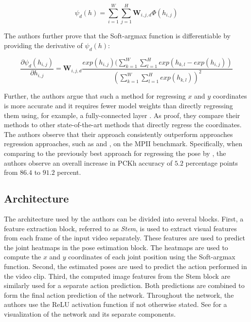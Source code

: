 \begin{equation}
    \label{eq:softargmax_conv}
    \psi_d(h) = \sum_{i=1}^W \sum_{j=1}^H \bm{W}_{i,j,d} \Phi(h_{i,j})
\end{equation}

The authors further prove that the Soft-argmax function is differentiable by providing the derivative of $\psi_d(h)$:

\begin{equation}
    \frac{\partial \psi_d(h_{i,j})}{\partial h_{i,j}} = \bm{W}_{i,j,d} \frac{ exp(h_{i,j}) (\sum_{k=1}^W \sum_{l=1}^H exp(h_{k,l} - exp(h_{i,j}) ) } { ( \sum_{k=1}^W \sum_{l=1}^H exp(h_{k,l}) )^2 }
\end{equation}

Further, the authors argue that such a method for regressing $x$ and $y$ coordinates is more accurate and it requires fewer model weights than directly regressing them using, for example, a fully-connected layer \cite{luvizon_human_2017}.
As proof, they compare their methods to other state-of-the-art methods that directly regress the coordinates.
The authors observe that their approach consistently outperform approaches regression approaches, such as \cite{carreira_human_2016} and \cite{sun_compositional_2017}, on the MPII benchmark.
Specifically, when comparing to the previously best approach for regressing the pose by \cite{sun_compositional_2017}, the authors observe an overall increase in PCKh accuracy of $5.2$ percentage points from $86.4$ to $91.2$ percent.

\subsection{Architecture}
\label{sec:deephar_architecture}

The architecture used by the authors can be divided into several blocks.
First, a feature extraction block, referred to as \textit{Stem}, is used to extract visual features from each frame of the input video separately.
These features are used to predict the joint heatmaps in the pose estimation block.
The heatmaps are used to compute the $x$ and $y$ coordinates of each joint position using the Soft-argmax function.
Second, the estimated poses are used to predict the action performed in the video clip.
Third, the computed image features from the Stem block are similarly used for a separate action prediction. 
Both predictions are combined to form the final action prediction of the network.
Throughout the network, the authors use the ReLU activation function if not otherwise stated.
See  for a visualization of the network and its separate components.

